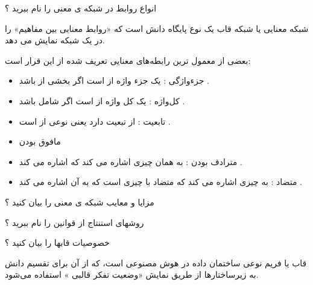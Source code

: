 \documentclass[12pt]{article}
\begin{document}
\vspace{30pt}


\noindent
انواع روابط در شبکه ی معنی را نام ببرید ؟


\begin{tcolorbox}
شبکه معنایی 
 یا شبکه قاب 
  یک نوع پایگاه دانش است که «روابط معنایی بین مفاهیم» را در یک شبکه نمایش می دهد.
\end{tcolorbox}


\begin{tcolorbox}
بعضی از معمول ترین رابطه‌های معنایی تعریف شده از این قرار است: 
\begin{itemize}
	\item جزءواژگی 
	 : 
	یک جزء واژه از
	است اگر 
	بخشی از
	باشد .
	\item کل‌واژه 
	 : 
	یک کل واژه از
	است اگر
	شامل 
	باشد .
	\item تابعیت
	 : 
	از 
	تبعیت دارد یعنی
	نوعی از 
	است .
	\item  مافوق بودن
	\item مترادف بودن 
	 :
	به همان چیزی اشاره می کند که
	اشاره می کند .
	\item متضاد
	 :
	به چیزی اشاره می کند که متضاد با چیزی است که
	به آن اشاره می کند .
\end{itemize}
    
\end{tcolorbox}


\vspace{30pt}



\noindent
مزایا و معایب شبکه ی معنی را بیان کنید ؟


\vspace{30pt}



\noindent
روشهای استنتاج از قوانین را نام ببرید ؟


\vspace{30pt}


\noindent
خصوصیات قابها را بیان کنید ؟

\begin{tcolorbox}
قاب 
یا فریم نوعی ساختمان داده در هوش مصنوعی است، که از آن برای تقسیم دانش به زیرساختارها از طریق نمایش «وضعیت تفکر قالبی 
» استفاده می‌شود.
\end{tcolorbox}
\end{document}
